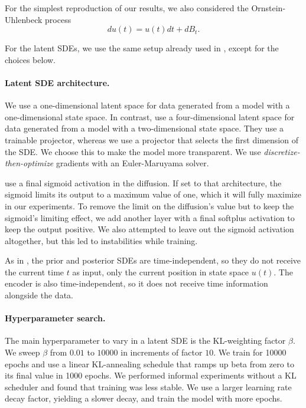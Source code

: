 \documentclass[twoside,11pt]{article}
\begin{document}
For the simplest reproduction of our results, we also considered the Ornstein-Uhlenbeck process
\[
    du(t) = u(t) dt + d B_t.
\]

For the latent SDEs, we use the same setup already used in \cite{li2020scalable}, except for the choices below.

\paragraph{Latent SDE architecture.}
We use a one-dimensional latent space for data generated from a model with a one-dimensional state space. In contrast, \cite{li2020scalable} use a four-dimensional latent space for data generated from a model with a two-dimensional state space. They use a trainable projector, whereas we use a projector that selects the first dimension of the SDE. We choose this to make the model more transparent. We use \textit{discretize-then-optimize} gradients \cite[][cf.]{kidgerefficient} with an Euler-Maruyama solver.

\cite{li2020scalable} use a final sigmoid activation in the diffusion. If set to that architecture, the sigmoid limits its output to a maximum value of one, which it will fully maximize in our experiments. To remove the limit on the diffusion's value but to keep the sigmoid's limiting effect, we add another layer with a final softplus activation to keep the output positive. We also attempted to leave out the sigmoid activation altogether, but this led to instabilities while training.

As in \cite{li2020scalable}, the prior and posterior SDEs are time-independent, so they do not receive the current time \(t\) as input, only the current position in state space \(u(t)\). The encoder is also time-independent, so it does not receive time information alongside the data.

\paragraph{Hyperparameter search.}
The main hyperparameter to vary in a latent SDE is the KL-weighting factor \(\beta\). We sweep \(\beta\) from \(0.01\) to \(10000\) in increments of factor \(10\). We train for 10000 epochs and use a linear KL-annealing schedule \citep{fu2019cyclical} that ramps up beta from zero to its final value in 1000 epochs. We performed informal experiments without a KL scheduler and found that training was less stable. We use a larger learning rate decay factor, yielding a slower decay, and train the model with more epochs.
\end{document}
